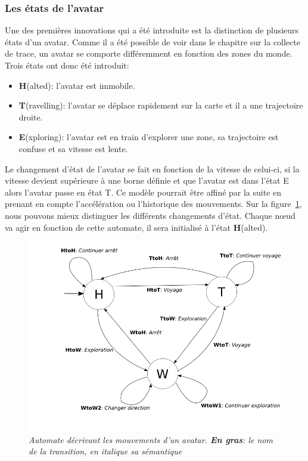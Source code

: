 	\subsubsection{Les états de l'avatar}
	\label{Automate}
	Une des premières innovations qui a été introduite est la distinction de plusieurs états d'un avatar. Comme il a été possible de voir dans le chapitre sur la collecte de trace, un avatar se comporte différemment en fonction des zones du monde. Trois états ont donc été introduit:
	\begin{itemize}
	\renewcommand{\labelitemi}{$\bullet$}
		\item \textbf{H}(alted): l'avatar est immobile.
		\item \textbf{T}(ravelling): l'avatar se déplace rapidement sur la carte et il a une trajectoire droite.  
		\item \textbf{E}(xploring): l'avatar est en train d'explorer une zone, sa trajectoire est confuse et sa vitesse est lente.
	\end{itemize} 
	Le changement d'état de l'avatar se fait en fonction de la vitesse de celui-ci, si la vitesse devient supérieure à une borne définie et que l'avatar est dans l'état E alors l'avatar passe en état T. Ce modèle pourrait être affiné par la suite en prenant en compte l'accélération ou l'historique des mouvements. Sur la figure~\ref{automateMob}, nous pouvons mieux distinguer les différents changements d'état. Chaque nœud va agir en fonction de cette automate, il sera initialisé à l'état \textbf{H}(alted). \\
	

	\begin{figure}[!h]
        \centering
        \includegraphics[scale=0.4]{./Ressources/Images/automate.png}
        \caption{\textit{\small Automate décrivant les mouvements d'un avatar. \textbf{En gras}: le nom de la transition, en \textit{italique} sa sémantique}}
        \label{automateMob}
        \end{figure}




